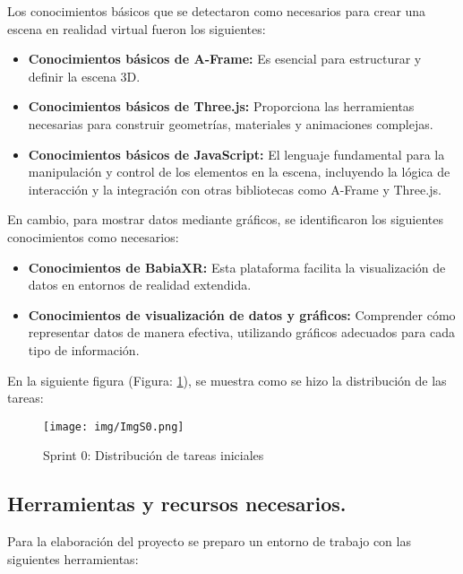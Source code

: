 \documentclass[a4paper, 12pt]{book}
\begin{document}
    Los conocimientos básicos que se detectaron como necesarios para crear una escena en realidad virtual fueron los siguientes:
    \begin{itemize} 
        \item \textbf{Conocimientos básicos de A-Frame:} Es esencial para estructurar y definir la escena 3D.
        \item \textbf{Conocimientos básicos de Three.js:} Proporciona las herramientas necesarias para construir geometrías, materiales y animaciones complejas.    
        \item \textbf{Conocimientos básicos de JavaScript:} El lenguaje fundamental para la manipulación y control de los elementos en la escena, incluyendo la lógica de interacción y la integración con otras bibliotecas como A-Frame y Three.js.   
    \end{itemize}

    En cambio, para mostrar datos mediante gráficos, se identificaron los siguientes conocimientos como necesarios:
    \begin{itemize}
        \item \textbf{Conocimientos de BabiaXR:} Esta plataforma facilita la visualización de datos en entornos de realidad extendida.
        \item \textbf{Conocimientos de visualización de datos y gráficos:} Comprender cómo representar datos de manera efectiva, utilizando gráficos adecuados para cada tipo de información.
    \end{itemize}

    En la siguiente figura (Figura: \ref{fig:ImgS0}), se muestra como se hizo la distribución de las tareas:
\begin{figure}[h]
    \centering
    \texttt{[image: img/ImgS0.png]}
    \caption{Sprint 0: Distribución de tareas iniciales}
    \label{fig:ImgS0}
\end{figure}
    
\vspace{1em}
    \subsection{Herramientas y recursos necesarios.}
    
    Para la elaboración del proyecto se preparo un entorno de trabajo con las siguientes herramientas:
        
\end{document}
